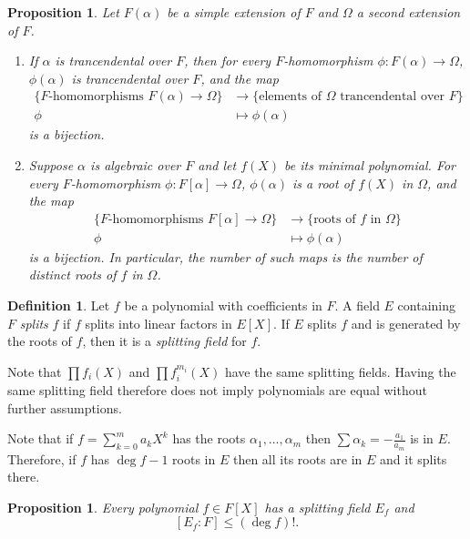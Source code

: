 \documentclass[11pt]{amsart}
\newtheorem{prop}[theo]{Proposition}
\theoremstyle{definition}
\newtheorem{defi}[theo]{Definition}
\begin{document}
\begin{prop}
Let $F(\alpha)$ be a simple extension of $F$ and $\Omega$ a second extension of $F$.

\begin{enumerate}
\item
If $\alpha$ is trancendental over $F$, then
for every $F$-homomorphism $\phi : F(\alpha) \to \Omega$, $\phi(\alpha)$ is trancendental over $F$, and the map 
\begin{align*}
\{\text{$F$-homomorphisms $F(\alpha) \to \Omega$}\}
&\to
\{\text{elements of $\Omega$ trancendental over $F$}\}
\\
\phi &\mapsto \phi(\alpha)
\end{align*}
is a bijection.

\item
Suppose $\alpha$ is algebraic over $F$ and let $f(X)$ be its minimal polynomial.
For every $F$-homomorphism $\phi : F[\alpha] \to \Omega$, $\phi(\alpha)$ is a root of $f(X)$ in $\Omega$, and the map
\begin{align*}
\{\text{$F$-homomorphisms $F[\alpha] \to \Omega$}\}
&\to
\{\text{roots of $f$ in $\Omega$}\}
\\
\phi &\mapsto \phi(\alpha)
\end{align*}
is a bijection.
In particular, the number of such maps is the number of distinct roots of $f$ in $\Omega$.
\end{enumerate}
\end{prop}


\begin{defi}
Let $f$ be a polynomial with coefficients in $F$.
A field $E$ containing $F$ \emph{splits} $f$ if $f$ splits into linear factors in $E[X]$.
If $E$ splits $f$ and is generated by the roots of $f$, then it is a \emph{splitting field} for $f$.
\end{defi}


Note that $\prod f_i(X)$ and $\prod f_i^{m_i}(X)$ have the same splitting fields.
Having the same splitting field therefore does not imply polynomials are equal without further assumptions.

Note that if $f = \sum_{k=0}^m a_k X^k$ has the roots $\alpha_1, \ldots, \alpha_m$ then $\sum \alpha_k = -\frac{a_1}{a_m}$ is in $E$.
Therefore, if $f$ has $\deg f - 1$ roots in $E$ then all its roots are in $E$ and it splits there.


\begin{prop}
Every polynomial $f \in F[X]$ has a splitting field $E_f$ and
\[
[E_f : F] \leq (\deg f)!.
\]
\end{prop}
\end{document}
